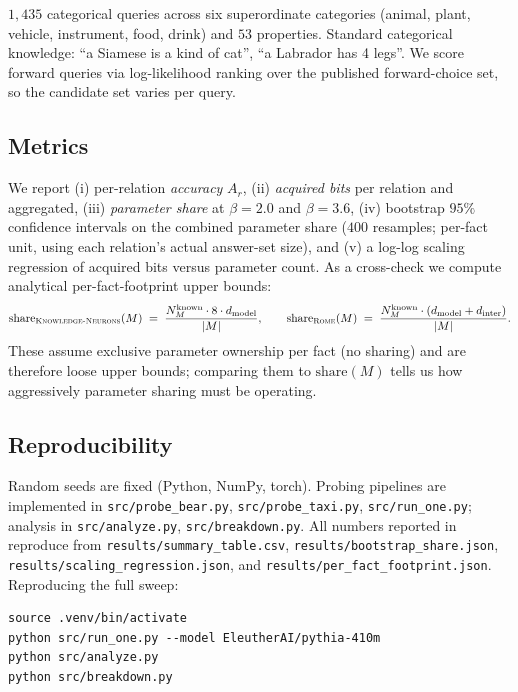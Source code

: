  \(1{,}435\) categorical queries across six superordinate categories (animal, plant, vehicle, instrument, food, drink) and \(53\) properties. Standard categorical knowledge: ``a Siamese is a kind of cat'', ``a Labrador has 4 legs''. We score forward queries via log-likelihood ranking over the published forward-choice set, so the candidate set varies per query.

\subsection{Metrics}

We report (i) per-relation \emph{accuracy} \(A_r\), (ii) \emph{acquired bits} per relation and aggregated, (iii) \emph{parameter share} at \(\beta = 2.0\) and \(\beta = 3.6\), (iv) bootstrap \(95\%\) confidence intervals on the combined parameter share (\(400\) resamples; per-fact unit, using each relation's actual answer-set size), and (v) a log-log scaling regression of acquired bits versus parameter count. As a cross-check we compute analytical per-fact-footprint upper bounds:
\[
\text{share}_{\textsc{Knowledge-Neurons}}(M) \;=\; \frac{N^{\text{known}}_M \cdot 8 \cdot d_{\text{model}}}{|M|},
\qquad
\text{share}_{\textsc{Rome}}(M) \;=\; \frac{N^{\text{known}}_M \cdot (d_{\text{model}} + d_{\text{inter}})}{|M|}.
\]
These assume exclusive parameter ownership per fact (no sharing) and are therefore loose upper bounds; comparing them to \(\text{share}(M)\) tells us how aggressively parameter sharing must be operating.

\subsection{Reproducibility}

Random seeds are fixed (Python, NumPy, torch). Probing pipelines are implemented in \texttt{src/probe\_bear.py}, \texttt{src/probe\_taxi.py}, \texttt{src/run\_one.py}; analysis in \texttt{src/analyze.py}, \texttt{src/breakdown.py}. All numbers reported in  reproduce from \texttt{results/summary\_table.csv}, \texttt{results/bootstrap\_share.json}, \texttt{results/scaling\_regression.json}, and \texttt{results/per\_fact\_footprint.json}. Reproducing the full sweep:
\begin{verbatim}
source .venv/bin/activate
python src/run_one.py --model EleutherAI/pythia-410m
python src/analyze.py
python src/breakdown.py
\end{verbatim}
